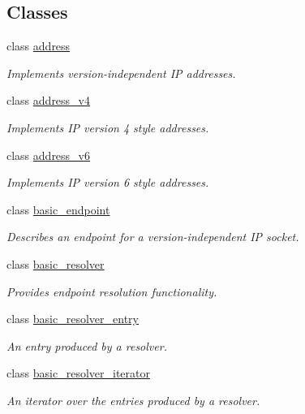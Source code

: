 \subsection*{Classes}
\begin{DoxyCompactItemize}
\item 
class \hyperlink{classasio_1_1ip_1_1address}{address}
\begin{DoxyCompactList}\small\item\em Implements version-\/independent I\+P addresses. \end{DoxyCompactList}\item 
class \hyperlink{classasio_1_1ip_1_1address__v4}{address\+\_\+v4}
\begin{DoxyCompactList}\small\item\em Implements I\+P version 4 style addresses. \end{DoxyCompactList}\item 
class \hyperlink{classasio_1_1ip_1_1address__v6}{address\+\_\+v6}
\begin{DoxyCompactList}\small\item\em Implements I\+P version 6 style addresses. \end{DoxyCompactList}\item 
class \hyperlink{classasio_1_1ip_1_1basic__endpoint}{basic\+\_\+endpoint}
\begin{DoxyCompactList}\small\item\em Describes an endpoint for a version-\/independent I\+P socket. \end{DoxyCompactList}\item 
class \hyperlink{classasio_1_1ip_1_1basic__resolver}{basic\+\_\+resolver}
\begin{DoxyCompactList}\small\item\em Provides endpoint resolution functionality. \end{DoxyCompactList}\item 
class \hyperlink{classasio_1_1ip_1_1basic__resolver__entry}{basic\+\_\+resolver\+\_\+entry}
\begin{DoxyCompactList}\small\item\em An entry produced by a resolver. \end{DoxyCompactList}\item 
class \hyperlink{classasio_1_1ip_1_1basic__resolver__iterator}{basic\+\_\+resolver\+\_\+iterator}
\begin{DoxyCompactList}\small\item\em An iterator over the entries produced by a resolver. \end{DoxyCompactList}\item 

\end{DoxyCompactItemize}
